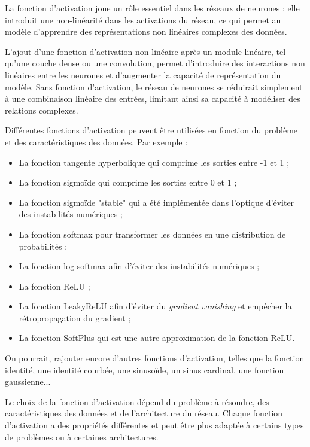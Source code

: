 \documentclass{article}
\begin{document}
La fonction d'activation joue un rôle essentiel dans les réseaux de neurones : elle introduit une non-linéarité dans les activations du réseau, ce qui permet au modèle d'apprendre des représentations non linéaires complexes des données.

L'ajout d'une fonction d'activation non linéaire après un module linéaire, tel qu'une couche dense ou une convolution, permet d'introduire des interactions non linéaires entre les neurones et d'augmenter la capacité de représentation du modèle. Sans fonction d'activation, le réseau de neurones se réduirait simplement à une combinaison linéaire des entrées, limitant ainsi sa capacité à modéliser des relations complexes.

Différentes fonctions d'activation peuvent être utilisées en fonction du problème et des caractéristiques des données. Par exemple :

\begin{itemize}
    \item La fonction tangente hyperbolique qui comprime les sorties entre -1 et 1 ;
    \item La fonction sigmoïde qui comprime les sorties entre 0 et 1 ;
    \item La fonction sigmoïde "stable" qui a été implémentée dans l'optique d'éviter des instabilités numériques ;
    \item La fonction softmax pour transformer les données en une distribution de probabilités ;
    \item La fonction log-softmax afin d'éviter des instabilités numériques ;
    \item La fonction ReLU ;
    \item La fonction LeakyReLU afin d'éviter du \textit{gradient vanishing} et empêcher la rétropropagation du gradient ;
    \item La fonction SoftPlus qui est une autre approximation de la fonction ReLU.
\end{itemize}

On pourrait, rajouter encore d'autres fonctions d'activation, telles que la fonction identité, une identité courbée, une sinusoïde, un sinus cardinal, une fonction gaussienne...

Le choix de la fonction d'activation dépend du problème à résoudre, des caractéristiques des données et de l'architecture du réseau. Chaque fonction d'activation a des propriétés différentes et peut être plus adaptée à certains types de problèmes ou à certaines architectures.
\end{document}
